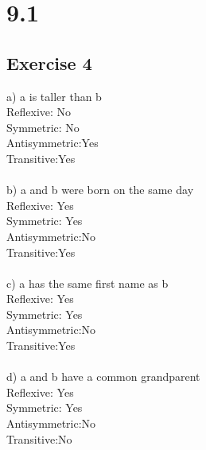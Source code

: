 \documentclass[12pt]{article}
\begin{document}
\section*{9.1}
\subsection*{Exercise 4}
a) a is taller than b\\
Reflexive: No\\
Symmetric: No\\
Antisymmetric:Yes\\
Transitive:Yes\\
\\
b) a and b were born on the same day\\
Reflexive: Yes\\
Symmetric: Yes\\
Antisymmetric:No\\
Transitive:Yes\\
\\
c) a has the same first name as b\\
Reflexive: Yes\\
Symmetric: Yes\\
Antisymmetric:No\\
Transitive:Yes\\
\\
d) a and b have a common grandparent\\
Reflexive: Yes\\
Symmetric: Yes\\
Antisymmetric:No\\
Transitive:No\\
\\
\end{document}
